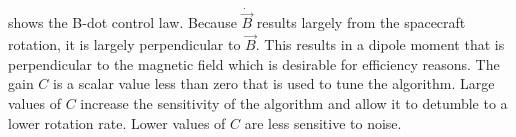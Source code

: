  shows the B-dot control law. Because $\dot{\vec{B}}$ results largely from the spacecraft rotation, it is largely perpendicular to $\vec{B}$. This results in a dipole moment that is perpendicular to the magnetic field which is desirable for efficiency reasons. The gain $C$ is a scalar value less than zero that is used to tune the algorithm. Large values of $C$ increase the sensitivity of the algorithm and allow it to detumble to a lower rotation rate. Lower values of $C$ are less sensitive to noise.

\begin{comment}
\subsection{Detumble}

The goal of the detumble mode is to reduce the rotation rates down to an acceptable level \todo{possibly call out such a level}.



\subsection{Alignment}

Once detumble is complete the alignment procedure begins. The alignment procedure takes a fixed 12 \todo{Double check this number} orbits to complete.

\subsubsection{Attitude Determination}

The original design did not use attitude determination to get the satellite into the proper orientation. Instead the rotation rates are used along with the bias windows to get the satellite into the right alignment. The problem is that computing the rotation to the needed accuracy is not a simple process. The original idea was that the rotation rates could be computed directly from magnetic field measurements. A set of magnetometer measurements would be taken each time step to compute the rotation rates. The problem is that to do the rotation rate calculation a derivative is needed. Numerical differentiation is possible but it tends to increase noise by acting as a high pass filter.


\end{comment}

